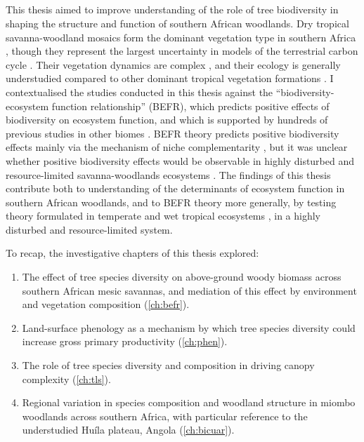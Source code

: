 \begin{refsection}


\chapter{\chaptertitle}
\label{ch:discussion}

This thesis aimed to improve understanding of the role of tree biodiversity in shaping the structure and function of southern African woodlands. Dry tropical savanna-woodland mosaics form the dominant vegetation type in southern Africa \citep{}, though they represent the largest uncertainty in models of the terrestrial carbon cycle \citep{Ahlstrom2015}. Their vegetation dynamics are complex \citep{}, and their ecology is generally understudied compared to other dominant tropical vegetation formations \citep{}. I contextualised the studies conducted in this thesis against the ``biodiversity-ecosystem function relationship'' (BEFR), which predicts positive effects of biodiversity on ecosystem function, and which is supported by hundreds of previous studies in other biomes \citep{}. BEFR theory predicts positive biodiversity effects mainly via the mechanism of niche complementarity \citep{}, but it was unclear whether positive biodiversity effects would be observable in highly disturbed and resource-limited savanna-woodlands ecosystems \citep{}. The findings of this thesis contribute both to understanding of the determinants of ecosystem function in southern African woodlands, and to BEFR theory more generally, by testing theory formulated in temperate and wet tropical ecosystems \citep{}, in a highly disturbed and resource-limited system.

To recap, the investigative chapters of this thesis explored: 

\begin{enumerate}
	\item{The effect of tree species diversity on above-ground woody biomass across southern African mesic savannas, and mediation of this effect by environment and vegetation composition (\autoref{ch:befr}).}
	\item{Land-surface phenology as a mechanism by which tree species diversity could increase gross primary productivity (\autoref{ch:phen}).}
	\item{The role of tree species diversity and composition in driving canopy complexity (\autoref{ch:tls}).}
	\item{Regional variation in species composition and woodland structure in miombo woodlands across southern Africa, with particular reference to the understudied Hu\'{i}la plateau, Angola (\autoref{ch:bicuar}).}
\end{enumerate}


\end{refsection}
